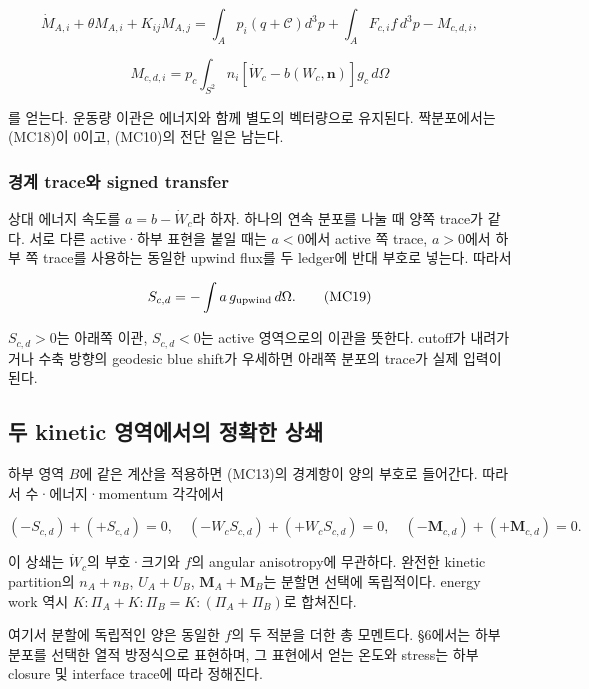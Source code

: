 \[
\dot M_{A,i}+\theta M_{A,i}+K_{ij}M_{A,j}
=\int_Ap_i(q+\mathcal C)d^3p
+\int_AF_{c,i}f\,d^3p-M_{c,d,i},
\tag{MC17}
\]

\[
M_{c,d,i}=p_c\int_{S^2}n_i
[\dot W_c-b(W_c,\boldsymbol n)]g_c\,d\Omega
\tag{MC18}
\]

를 얻는다. 운동량 이관은 에너지와 함께 별도의 벡터량으로 유지된다. 짝분포에서는 (MC18)이 0이고, (MC10)의 전단 일은 남는다.

\hypertarget{uxacbduxacc4-traceuxc640-signed-transfer}{%
\subsubsection{경계 trace와 signed transfer}\label{uxacbduxacc4-traceuxc640-signed-transfer}}

상대 에너지 속도를 \(a=b-\dot W_c\)라 하자. 하나의 연속 분포를 나눌 때 양쪽 trace가 같다. 서로 다른 active·하부 표현을 붙일 때는 \(a<0\)에서 active 쪽 trace, \(a>0\)에서 하부 쪽 trace를 사용하는 동일한 upwind flux를 두 ledger에 반대 부호로 넣는다. 따라서

\[
S_{c,d}=-\int a\,g_{\rm upwind}\,d\Omega.
\tag{MC19}
\]

\(S_{c,d}>0\)는 아래쪽 이관, \(S_{c,d}<0\)는 active 영역으로의 이관을 뜻한다. cutoff가 내려가거나 수축 방향의 geodesic blue shift가 우세하면 아래쪽 분포의 trace가 실제 입력이 된다.

\hypertarget{uxb450-kinetic-uxc601uxc5eduxc5d0uxc11cuxc758-uxc815uxd655uxd55c-uxc0c1uxc1c4}{%
\subsection{두 kinetic 영역에서의 정확한 상쇄}\label{uxb450-kinetic-uxc601uxc5eduxc5d0uxc11cuxc758-uxc815uxd655uxd55c-uxc0c1uxc1c4}}

하부 영역 \(B\)에 같은 계산을 적용하면 (MC13)의 경계항이 양의 부호로 들어간다. 따라서 수·에너지·momentum 각각에서

\[
(-S_{c,d})+(+S_{c,d})=0,
\quad(-W_cS_{c,d})+(+W_cS_{c,d})=0,
\quad(-\boldsymbol M_{c,d})+(+\boldsymbol M_{c,d})=0.
\tag{MC20}
\]

이 상쇄는 \(\dot W_c\)의 부호·크기와 \(f\)의 angular anisotropy에 무관하다. 완전한 kinetic partition의 \(n_A+n_B\), \(U_A+U_B\), \(\boldsymbol M_A+\boldsymbol M_B\)는 분할면 선택에 독립적이다. energy work 역시 \(K:\Pi_A+K:\Pi_B=K:(\Pi_A+\Pi_B)\)로 합쳐진다.

여기서 분할에 독립적인 양은 동일한 \(f\)의 두 적분을 더한 총 모멘트다. §6에서는 하부 분포를 선택한 열적 방정식으로 표현하며, 그 표현에서 얻는 온도와 stress는 하부 closure 및 interface trace에 따라 정해진다.

